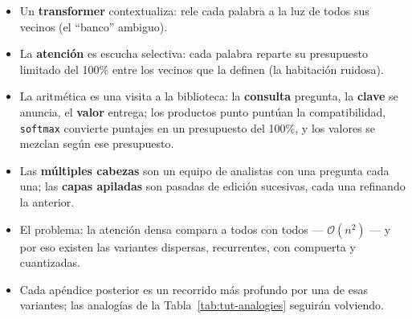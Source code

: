\begin{itemize}[leftmargin=*]
    \item Un \textbf{transformer} contextualiza: rele cada palabra a la luz de todos sus vecinos (el ``banco'' ambiguo).
    \item La \textbf{atención} es escucha selectiva: cada palabra reparte su presupuesto limitado del 100\% entre los vecinos que la definen (la habitación ruidosa).
    \item La aritmética es una visita a la biblioteca: la \textbf{consulta} pregunta, la \textbf{clave} se anuncia, el \textbf{valor} entrega; los productos punto puntúan la compatibilidad, \texttt{softmax} convierte puntajes en un presupuesto del 100\%, y los valores se mezclan según ese presupuesto.
    \item Las \textbf{múltiples cabezas} son un equipo de analistas con una pregunta cada una; las \textbf{capas apiladas} son pasadas de edición sucesivas, cada una refinando la anterior.
    \item El problema: la atención densa compara a todos con todos --- $\mathcal{O}(n^2)$ --- y por eso existen las variantes dispersas, recurrentes, con compuerta y cuantizadas.
    \item Cada apéndice posterior es un recorrido más profundo por una de esas variantes; las analogías de la Tabla~\ref{tab:tut-analogies} seguirán volviendo.
\end{itemize}

